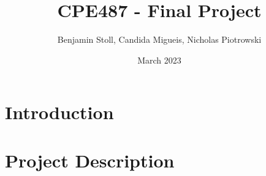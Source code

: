 \documentclass{article}
\title{CPE487 - Final Project}
\author{Benjamin Stoll, Candida Migueis, Nicholas Piotrowski}
\date{March 2023}
\begin{document}
\maketitle

\section*{Introduction}


\section*{Project Description}

\end{document}
